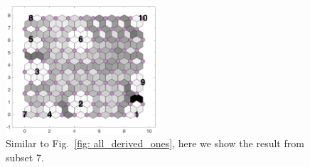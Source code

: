 \begin{figure}
        \centering
        \includegraphics[width=0.5\textwidth]{../../images0.01/M31/2D/image_subsets/subset7_dist_with_hits_t.png}
    \caption{Similar to Fig.~\ref{fig: all_derived_ones}, here we show the result from subset 7.}
    \label{fig: subset7}
\end{figure}